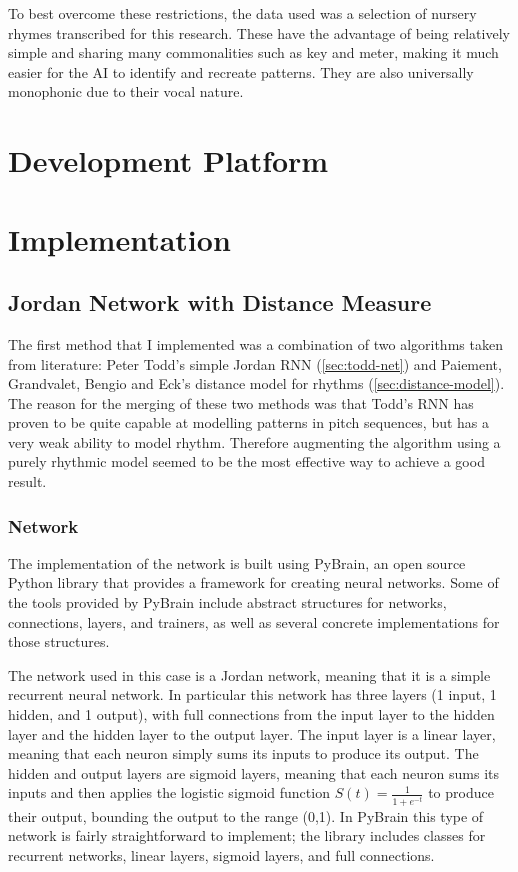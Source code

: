 \documentclass[ author={Stephen Livermore-Tozer},
				supervisor={Dr. Peter Flach},
				degree={MEng},
				title={Performing Algorithmic Co-composition Using Machine Learning},
				subtitle={},
				type={research},
				year={2016} ]{dissertation}
\begin{document}
	To best overcome these restrictions, the data used was a selection of nursery rhymes transcribed for this research. These have the advantage of being relatively simple and sharing many commonalities such as key and meter, making it much easier for the AI to identify and recreate patterns. They are also universally monophonic due to their vocal nature.
	
	\section{Development Platform}
	
	\section{Implementation}
	
	\subsection{Jordan Network with Distance Measure}
	\label{sec:jordan-implementation}
	
	The first method that I implemented was a combination of two algorithms taken from literature: Peter Todd's simple Jordan RNN (\ref{sec:todd-net}) and Paiement, Grandvalet, Bengio and Eck's distance model for rhythms (\ref{sec:distance-model}). The reason for the merging of these two methods was that Todd's RNN has proven to be quite capable at modelling patterns in pitch sequences, but has a very weak ability to model rhythm. Therefore augmenting the algorithm using a purely rhythmic model seemed to be the most effective way to achieve a good result.
	
	\subsubsection{Network}
	
	The implementation of the network is built using PyBrain, an open source Python library that provides a framework for creating neural networks. Some of the tools provided by PyBrain include abstract structures for networks, connections, layers, and trainers, as well as several concrete implementations for those structures.
	
	The network used in this case is a Jordan network, meaning that it is a simple recurrent neural network. In particular this network has three layers (1 input, 1 hidden, and 1 output), with full connections from the input layer to the hidden layer and the hidden layer to the output layer. The input layer is a linear layer, meaning that each neuron simply sums its inputs to produce its output. The hidden and output layers are sigmoid layers, meaning that each neuron sums its inputs and then applies the logistic sigmoid function $ S(t) = \frac{1}{1 + e^{-t}} $ to produce their output, bounding the output to the range (0,1).
	In PyBrain this type of network is fairly straightforward to implement; the library includes classes for recurrent networks, linear layers, sigmoid layers, and full connections.
	
\end{document}
